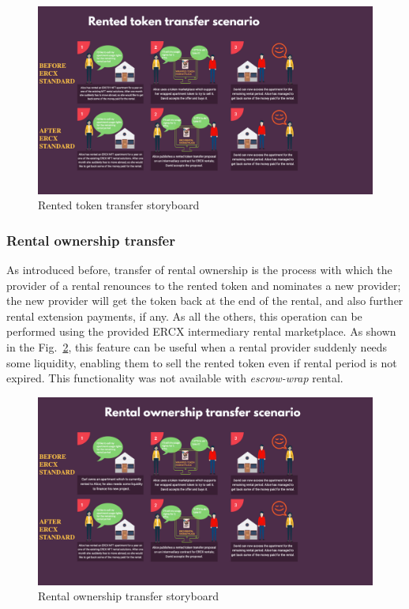 \documentclass[english, LaM, oneside]{sapthesis}%
\begin{document}
\begin{figure}
    \centering
        \begin{adjustbox}{width=1\textwidth}
            \includegraphics{storyboards/rentedTokenTransfer.pdf}
        \end{adjustbox}
    \caption{Rented token transfer storyboard}
    \label{fig:RentedTokenTransfer SB}
\end{figure}

\subsubsection{Rental ownership transfer}
As introduced before, transfer of rental ownership is the process with which the provider of a rental renounces to the rented token and nominates a new provider; the new provider will get the token back at the end of the rental, and also further rental extension payments, if any. As all the others, this operation can be performed using the provided ERCX intermediary rental marketplace. \newline
As shown in the Fig.~\ref{fig:RentalOwnershipTransfer SB}, this feature can be useful when a rental provider suddenly needs some liquidity, enabling them to sell the rented token even if rental period is not expired.\newline
This functionality was not available with \textit{escrow-wrap} rental.

\begin{figure}
    \centering
        \begin{adjustbox}{width=1\textwidth}
            \includegraphics{storyboards/rentalTransfer.pdf}
        \end{adjustbox}
    \caption{Rental ownership transfer storyboard}
    \label{fig:RentalOwnershipTransfer SB}
\end{figure}
\end{document}
